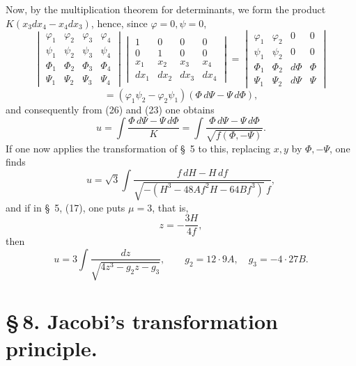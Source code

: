 \documentclass[11pt]{article}
\begin{document}
Now, by the multiplication theorem for determinants, we form the product $K(x_3dx_4-x_4dx_3)$, hence, since $\varphi=0,\psi=0$,
\[
\begin{vmatrix}
\varphi_1&\varphi_2&\varphi_3&\varphi_4\\
\psi_1&\psi_2&\psi_3&\psi_4\\
\Phi_1&\Phi_2&\Phi_3&\Phi_4\\
\Psi_1&\Psi_2&\Psi_3&\Psi_4
\end{vmatrix}
\begin{vmatrix}
1&0&0&0\\
0&1&0&0\\
x_1&x_2&x_3&x_4\\
dx_1&dx_2&dx_3&dx_4
\end{vmatrix}
=
\begin{vmatrix}
\varphi_1&\varphi_2&0&0\\
\psi_1&\psi_2&0&0\\
\Phi_1&\Phi_2&d\Phi&\Phi\\
\Psi_1&\Psi_2&d\Psi&\Psi
\end{vmatrix}
\]
\[
=(\varphi_1\psi_2-\varphi_2\psi_1)(\Phi\,d\Psi-\Psi\,d\Phi),
\]
and consequently from (26) and (23) one obtains
\begin{equation}
u=\int\frac{\Phi\,d\Psi-\Psi\,d\Phi}{K}
=\int\frac{\Phi\,d\Psi-\Psi\,d\Phi}{\sqrt{f(\Phi,-\Psi)}}.
\tag{27}
\end{equation}
If one now applies the transformation of \S~5 to this, replacing $x,y$ by $\Phi,-\Psi$, one finds
\[
u=\sqrt3\int \frac{f\,dH-H\,df}{\sqrt{-(H^3-48Af^2H-64Bf^3)}\,f},
\]
and if in \S~5, (17), one puts $\mu=3$, that is,
\[
z=-\frac{3H}{4f},
\]
then
\[
u=3\int\frac{dz}{\sqrt{4z^3-g_2z-g_3}},
\qquad
g_2=12\cdot9A,\quad g_3=-4\cdot27B.
\]

\section*{\S\,8. Jacobi's transformation principle.}
\end{document}
